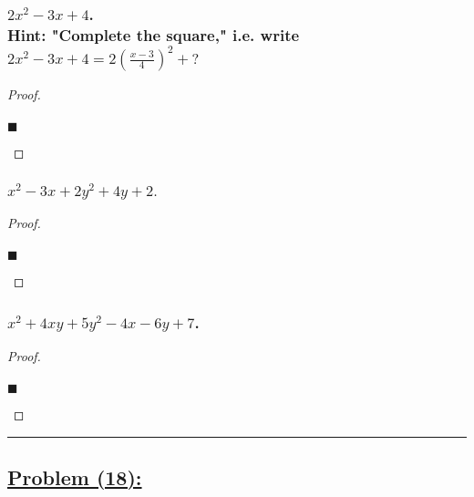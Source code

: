 \documentclass[letterpaper, 10 pt, conference]{ieeeconf}  %
\begin{document}
\subsubsection{\textbf{$2x^2 - 3x + 4$. \\ Hint: "Complete the square," i.e. write $2x^2 - 3x + 4 = 2(\frac{x - 3}{4})^2 + ?$}}

\begin{proof}
\begin{align}
    
\end{align}
\begin{flushright}
$\blacksquare$
\end{flushright}
\end{proof}

\subsubsection{\textbf{$x^2 - 3x + 2y^2 + 4y +2.$}}

\begin{proof}
\begin{align}
    
\end{align}
\begin{flushright}
$\blacksquare$
\end{flushright}
\end{proof}

\subsubsection{\textbf{$x^2 + 4xy + 5y^2 - 4x - 6y + 7$.}}

\begin{proof}
\begin{align}
    
\end{align}
\begin{flushright}
$\blacksquare$
\end{flushright}
\end{proof}

\noindent\rule{8cm}{0.4pt}
\subsection{\textbf{\underline{Problem (18):}}}
\end{document}
